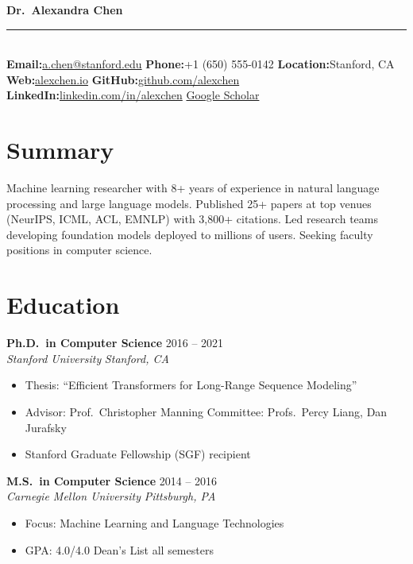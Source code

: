 \documentclass[11pt,a4paper]{article}
\newcommand{\cventry}[4]{%
  \textbf{#1} \hfill {\color{lightgray}#2}\\
  {\color{accent}\textit{#3}} \hfill {\color{lightgray}\textit{#4}}\\[2pt]
}
\newcommand{\cvsep}{\vspace{6pt}}
\newcommand{\cvfield}[2]{{\color{primary}\bfseries #1:}\;#2}
\newcommand{\cvdot}{{\color{lightgray}\textbullet}\quad}
\begin{document}
\begin{center}
  {\fontsize{28}{34}\selectfont\bfseries\color{primary} Dr.\ Alexandra Chen}\\[8pt]
  {\color{lightgray}\rule{8cm}{0.5pt}}\\[8pt]
  {\small
    \cvfield{Email}{\href{mailto:a.chen@stanford.edu}{a.chen@stanford.edu}} \cvdot
    \cvfield{Phone}{+1 (650) 555-0142} \cvdot
    \cvfield{Location}{Stanford, CA}\\[4pt]
    \cvfield{Web}{\href{https://alexchen.io}{alexchen.io}} \cvdot
    \cvfield{GitHub}{\href{https://github.com/alexchen}{github.com/alexchen}} \cvdot
    \cvfield{LinkedIn}{\href{https://linkedin.com/in/alexchen}{linkedin.com/in/alexchen}} \cvdot
    \href{https://scholar.google.com/citations?user=XXXXX}{Google Scholar}
  }
\end{center}

\vspace{4pt}

\section{Summary}

Machine learning researcher with 8+ years of experience in natural language processing and large language models. Published 25+ papers at top venues (NeurIPS, ICML, ACL, EMNLP) with 3,800+ citations. Led research teams developing foundation models deployed to millions of users. Seeking faculty positions in computer science.

\section{Education}

\cventry{Ph.D.\ in Computer Science}{2016 -- 2021}{Stanford University}{Stanford, CA}
\begin{itemize}[leftmargin=1.5em, nosep, itemsep=2pt]
  \item Thesis: ``Efficient Transformers for Long-Range Sequence Modeling''
  \item Advisor: Prof.\ Christopher Manning \quad Committee: Profs.\ Percy Liang, Dan Jurafsky
  \item Stanford Graduate Fellowship (SGF) recipient
\end{itemize}

\cvsep

\cventry{M.S.\ in Computer Science}{2014 -- 2016}{Carnegie Mellon University}{Pittsburgh, PA}
\begin{itemize}[leftmargin=1.5em, nosep, itemsep=2pt]
  \item Focus: Machine Learning and Language Technologies
  \item GPA: 4.0/4.0 \quad Dean's List all semesters
\end{itemize}
\end{document}
